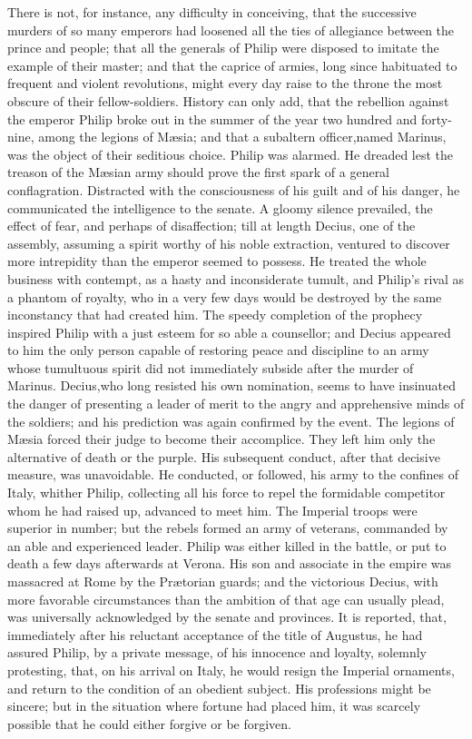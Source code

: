 There is not, for instance, any difficulty in conceiving, that
the successive murders of so many emperors had loosened all the
ties of allegiance between the prince and people; that all the
generals of Philip were disposed to imitate the example of their
master; and that the caprice of armies, long since habituated to
frequent and violent revolutions, might every day raise to the
throne the most obscure of their fellow-soldiers. History can
only add, that the rebellion against the emperor Philip broke out
in the summer of the year two hundred and forty-nine, among the
legions of Mæsia; and that a subaltern officer,\footnotemark[1] named Marinus,
was the object of their seditious choice. Philip was alarmed. He
dreaded lest the treason of the Mæsian army should prove the
first spark of a general conflagration. Distracted with the
consciousness of his guilt and of his danger, he communicated the
intelligence to the senate. A gloomy silence prevailed, the
effect of fear, and perhaps of disaffection; till at length
Decius, one of the assembly, assuming a spirit worthy of his
noble extraction, ventured to discover more intrepidity than the
emperor seemed to possess. He treated the whole business with
contempt, as a hasty and inconsiderate tumult, and Philip’s rival
as a phantom of royalty, who in a very few days would be
destroyed by the same inconstancy that had created him. The
speedy completion of the prophecy inspired Philip with a just
esteem for so able a counsellor; and Decius appeared to him the
only person capable of restoring peace and discipline to an army
whose tumultuous spirit did not immediately subside after the
murder of Marinus. Decius,\footnotemark[2] who long resisted his own
nomination, seems to have insinuated the danger of presenting a
leader of merit to the angry and apprehensive minds of the
soldiers; and his prediction was again confirmed by the event.
The legions of Mæsia forced their judge to become their
accomplice. They left him only the alternative of death or the
purple. His subsequent conduct, after that decisive measure, was
unavoidable. He conducted, or followed, his army to the confines
of Italy, whither Philip, collecting all his force to repel the
formidable competitor whom he had raised up, advanced to meet
him. The Imperial troops were superior in number; but the rebels
formed an army of veterans, commanded by an able and experienced
leader. Philip was either killed in the battle, or put to death a
few days afterwards at Verona. His son and associate in the
empire was massacred at Rome by the Prætorian guards; and the
victorious Decius, with more favorable circumstances than the
ambition of that age can usually plead, was universally
acknowledged by the senate and provinces. It is reported, that,
immediately after his reluctant acceptance of the title of
Augustus, he had assured Philip, by a private message, of his
innocence and loyalty, solemnly protesting, that, on his arrival
on Italy, he would resign the Imperial ornaments, and return to
the condition of an obedient subject. His professions might be
sincere; but in the situation where fortune had placed him, it
was scarcely possible that he could either forgive or be
forgiven.\footnotemark[3]

